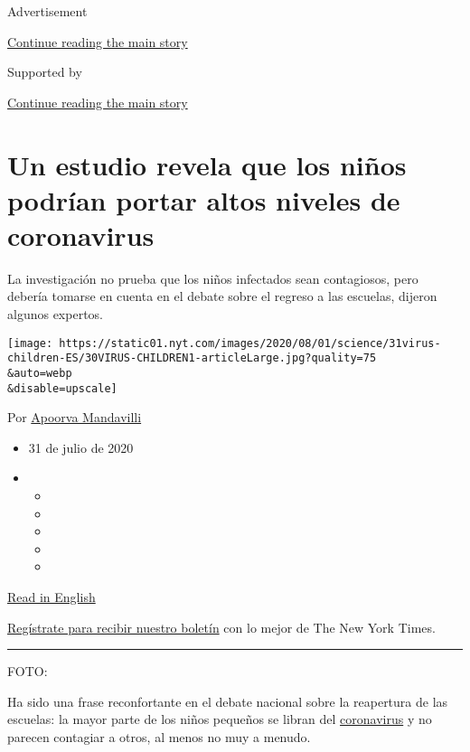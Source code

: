 Advertisement

\protect\hyperlink{after-top}{Continue reading the main story}

Supported by

\protect\hyperlink{after-sponsor}{Continue reading the main story}

\hypertarget{un-estudio-revela-que-los-niuxf1os-podruxedan-portar-altos-niveles-de-coronavirus}{%
\section{Un estudio revela que los niños podrían portar altos niveles de
coronavirus}\label{un-estudio-revela-que-los-niuxf1os-podruxedan-portar-altos-niveles-de-coronavirus}}

La investigación no prueba que los niños infectados sean contagiosos,
pero debería tomarse en cuenta en el debate sobre el regreso a las
escuelas, dijeron algunos expertos.

\texttt{[image: https://static01.nyt.com/images/2020/08/01/science/31virus-children-ES/30VIRUS-CHILDREN1-articleLarge.jpg?quality=75\\\&auto=webp\\\&disable=upscale]}

Por \href{https://www.nytimes.com/by/apoorva-mandavilli}{Apoorva
Mandavilli}

\begin{itemize}
\item
  31 de julio de 2020
\item
  \begin{itemize}
  \item
  \item
  \item
  \item
  \item
  \end{itemize}
\end{itemize}

\href{https://www.nytimes.com/2020/07/30/health/coronavirus-children.html}{Read
in English}

\href{https://www.nytimes.com/newsletters/el-times}{Regístrate para
recibir nuestro boletín} con lo mejor de The New York Times.

\begin{center}\rule{0.5\linewidth}{\linethickness}\end{center}

FOTO:

Ha sido una frase reconfortante en el debate nacional sobre la
reapertura de las escuelas: la mayor parte de los niños pequeños se
libran del
\href{https://www.nytimes.com/es/interactive/2020/espanol/mundo/coronavirus-en-estados-unidos.html}{coronavirus}
y no parecen contagiar a otros, al menos no muy a menudo.

